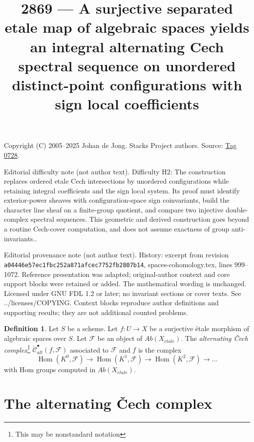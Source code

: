 \documentclass{amsart}
\theoremstyle{plain}
\theoremstyle{definition}
\newtheorem{definition}[subsection]{Definition}
\theoremstyle{remark}
\numberwithin{equation}{subsection}
\def\Hom{\mathop{\mathrm{Hom}}\nolimits}
\def\etale{{\acute{e}tale}}
\begin{document}
\title[Stacks Project, Tag 0728]{2869 --- A surjective separated etale map of algebraic spaces yields an integral alternating Cech spectral sequence on unordered distinct-point configurations with sign local coefficients}
\maketitle
\noindent Copyright (C) 2005--2025 Johan de Jong. Stacks Project authors. Source: \href{https://stacks.math.columbia.edu/tag/0728}{Tag 0728}.

\noindent Editorial difficulty note (not author text). Difficulty H2: The construction replaces ordered etale Cech intersections by unordered configurations while retaining integral coefficients and the sign local system. Its proof must identify exterior-power sheaves with configuration-space sign coinvariants, build the character line sheaf on a finite-group quotient, and compare two injective double-complex spectral sequences. This geometric and derived construction goes beyond a routine Cech-cover computation, and does not assume exactness of group anti-invariants..

\noindent Editorial provenance note (not author text). History: excerpt from revision \texttt{a0444\allowbreak 6e57e\allowbreak c1fbc\allowbreak 252a8\allowbreak 71afc\allowbreak ec775\allowbreak 2fb28\allowbreak 07b14}, spaces-cohomology.tex, lines 999--1072. Reference presentation was adapted; original-author context and core support blocks were retained or added. The mathematical wording is unchanged. Licensed under GNU FDL 1.2 or later; no invariant sections or cover texts. See ../licenses/COPYING. Context blocks reproduce author definitions and supporting results; they are not additional counted problems.

\begin{definition}
\label{definition-alternating-cech-complex}
Let $S$ be a scheme. Let $f : U \to X$ be a surjective \'etale morphism
of algebraic spaces over $S$. Let $\mathcal{F}$ be an object of
$\textit{Ab}(X_\etale)$. The
{\it alternating {\v C}ech complex}\footnote{This may be nonstandard notation}
$\check{\mathcal{C}}^\bullet_{alt}(f, \mathcal{F})$
associated to $\mathcal{F}$ and $f$ is the complex
$$
\Hom(K^0, \mathcal{F}) \to \Hom(K^1, \mathcal{F}) \to
\Hom(K^2, \mathcal{F}) \to \ldots
$$
with Hom groups computed in $\textit{Ab}(X_\etale)$.
\end{definition}

\section{The alternating {\v C}ech complex}
\label{section-alternating-cech}
\end{document}
